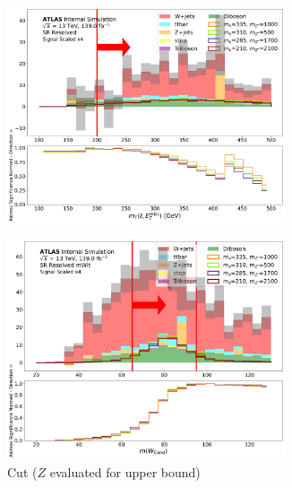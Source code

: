   \begin{figure}[htbp]
  \centering
    \begin{subfigure}[t]{0.48\textwidth}
    \centering
     \includegraphics[width = 0.9\textwidth]{Figures/5/SR1L_Resolved/mT_lep_met_normSig_N_1.pdf}
    \caption{\mtlepmet}
    \end{subfigure}
    \begin{subfigure}[t]{0.48\textwidth}
    \centering
     \includegraphics[width = 0.9\textwidth]{Figures/5/SR1L_Resolved_mWlt/WCand_m_normSig_N_1.pdf}
     \caption{\Wcandm Cut (\(Z\) evaluated for upper bound)}
    \end{subfigure}
    \begin{subfigure}[t]{0.48\textwidth}
    \centering

\end{subfigure}
\end{figure}
